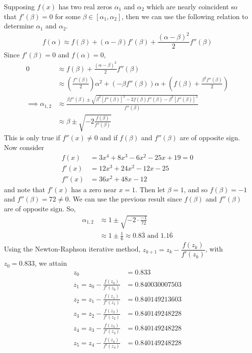 \documentclass[12pt]{article}
\begin{document}
\noindent Supposing $f(x)$ has two real zeros $\alpha_1$ and $\alpha_2$ which are nearly coincident so that $f'(\beta) = 0$ for some $\beta \in [\alpha_1, \alpha_2]$, then we can use the following relation to determine $\alpha_1$ and $\alpha_2$.
\begin{align*}
f(\alpha) \approx f(\beta) + (\alpha - \beta)f'(\beta) + \dfrac{(\alpha - \beta)^2}{2}f''(\beta)
\end{align*}
Since $f'(\beta) = 0$ and $f(\alpha) = 0$, 
\begin{align*}
0 &\approx f(\beta) + \frac{(\alpha - \beta)^2}{2}f''(\beta) \\
&\approx \left(\frac{f''(\beta)}{2}\right)\alpha^2 + \left(-\beta f''(\beta)\right)\alpha + \left(f(\beta) + \frac{\beta^2f''(\beta)}{2}\right) \\
\implies \alpha_{1,2} &\approx \frac{\beta f''(\beta) \pm \sqrt{\beta^2\left[f''(\beta)\right]^2 - 2f(\beta)f''(\beta) - \beta^2\left[f''(\beta)\right]^2}}{f''(\beta)} \\
&\approx \beta \pm \sqrt{-2\frac{f(\beta)}{f''(\beta)}}
\end{align*}
This is only true if $f''(x) \neq 0$ and if $f(\beta)$ and $f''(\beta)$ are of opposite sign.  Now consider
\begin{align*}
f(x) &= 3x^4 + 8x^3 - 6x^2 - 25x + 19 = 0 \\
f'(x) &= 12x^3 + 24x^2 - 12x - 25 \\
f''(x) &= 36x^2 + 48x - 12
\end{align*}
and note that $f'(x)$ has a zero near $x = 1$.  Then let $\beta = 1$, and so $f(\beta) = -1$ and $f''(\beta) = 72 \neq 0$.  We can use the previous result since $f(\beta)$ and $f''(\beta)$ are of opposite sign.  So,
\begin{align*}
\alpha_{1,2} &\approx 1 \pm \sqrt{-2\cdot \frac{-1}{72}} \\
&\approx 1 \pm \frac{1}{6} \approx 0.8\overline{3} \text{ and } 1.1\overline{6
}\end{align*}
Using the Newton-Raphson iterative method, $z_{k+1} = z_k - \dfrac{f(z_k)}{f'(z_k)}$, with $z_0 = 0.833$, we attain
\begin{align*}
z_0 &= 0.833 \\
z_1 = z_0 - \frac{f(z_0)}{f'(z_0)} &= 0.840030007503 \\
z_2 = z_1 - \frac{f(z_1)}{f'(z_1)} &=  0.840149213603 \\
z_3 = z_2 - \frac{f(z_2)}{f'(z_2)} &=  0.840149248228 \\
z_4 = z_3 - \frac{f(z_3)}{f'(z_3)} &=  0.840149248228 \\
z_5 = z_4 - \frac{f(z_4)}{f'(z_4)} &=  0.840149248228
\end{align*}
\end{document}
